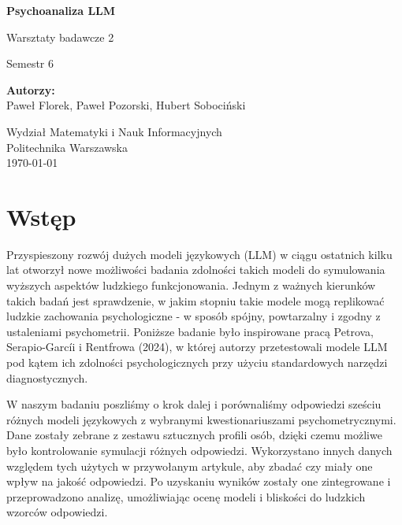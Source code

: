 \documentclass{article}
\begin{document}
\begin{titlepage}
    \centering
    \vspace*{1cm}

    \Huge
    \textbf{Psychoanaliza LLM}

    \vspace{0.5cm}
    \LARGE
    Warsztaty badawcze 2
    

    \LARGE
    Semestr 6

    \vspace{1.5cm}

    \textbf{Autorzy:}\\
    Paweł Florek, Paweł Pozorski, Hubert Sobociński

    \vfill

    \vfill

    \Large
    Wydział Matematyki i Nauk Informacyjnych \\
    Politechnika Warszawska\\
    \today

\end{titlepage}

\tableofcontents

\newpage
\section{Wstęp}
Przyspieszony rozwój dużych modeli językowych (LLM) w ciągu ostatnich kilku lat otworzył nowe możliwości badania zdolności takich modeli do symulowania wyższych 
aspektów ludzkiego funkcjonowania. Jednym z ważnych kierunków takich badań jest sprawdzenie, w jakim stopniu takie modele mogą replikować ludzkie zachowania 
psychologiczne - w sposób spójny, powtarzalny i zgodny z ustaleniami psychometrii. Poniższe badanie było inspirowane pracą Petrova, Serapio-Garcíi i 
Rentfrowa (2024), w której autorzy przetestowali modele LLM pod kątem ich zdolności psychologicznych przy użyciu standardowych narzędzi diagnostycznych.

W naszym badaniu poszliśmy o krok dalej i porównaliśmy odpowiedzi sześciu różnych modeli językowych z wybranymi kwestionariuszami psychometrycznymi. 
Dane zostały zebrane z zestawu sztucznych profili osób, dzięki czemu możliwe było kontrolowanie symulacji różnych odpowiedzi. Wykorzystano innych danych względem tych użytych w przywołanym artykule, aby zbadać czy miały one wpływ na jakość odpowiedzi.
Po uzyskaniu wyników zostały one zintegrowane i przeprowadzono analizę, umożliwiając ocenę modeli i bliskości do ludzkich wzorców odpowiedzi.
\end{document}

